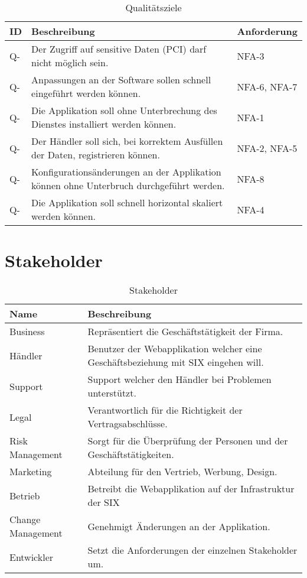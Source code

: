 \begin{table}[H]
	\centering
	\caption{Qualitätsziele}
	\begin{tabular}{ | p{1cm} | p{11cm} | p{3cm} | }
		\toprule
		{\textbf{ID}} & {\textbf{Beschreibung}} & {\textbf{Anforderung}}\\
		\midrule
		Q-\arabic{quatar} \stepcounter{quatar} & Der Zugriff auf sensitive Daten (PCI) darf nicht möglich sein. & NFA-3\\ \hline
		Q-\arabic{quatar} \stepcounter{quatar} & Anpassungen an der Software sollen schnell eingeführt werden können. & NFA-6, NFA-7\\ \hline
		Q-\arabic{quatar} \stepcounter{quatar} & Die Applikation soll ohne Unterbrechung des Dienstes installiert werden können. & NFA-1\\ \hline
		Q-\arabic{quatar} \stepcounter{quatar} & Der Händler soll sich, bei korrektem Ausfüllen der Daten, registrieren können. & NFA-2, NFA-5 \\ \hline
		Q-\arabic{quatar} \stepcounter{quatar} & Konfigurationsänderungen an der Applikation können ohne Unterbruch durchgeführt werden. & NFA-8 \\ \hline
		Q-\arabic{quatar} \stepcounter{quatar} & Die Applikation soll schnell horizontal skaliert werden können. & NFA-4 \\
		\bottomrule
	\end{tabular}
\end{table}

\section{Stakeholder}

\begin{table}[H]
	\centering
	\caption{Stakeholder}
	\begin{tabular}{ | p{3cm} | p{12cm} | }
		\toprule
		{\textbf{Name}} & {\textbf{Beschreibung}} \\
		\midrule
		Business & Repräsentiert die Geschäftstätigkeit der Firma.\\ \hline
		Händler & Benutzer der Webapplikation welcher eine Geschäftsbeziehung mit SIX eingehen will. \\ \hline
		Support & Support welcher den Händler bei Problemen unterstützt. \\ \hline
		Legal &  Verantwortlich für die Richtigkeit der Vertragsabschlüsse. \\ \hline
		Risk Management & Sorgt für die Überprüfung der Personen und der Geschäftstätigkeiten. \\ \hline
		Marketing & Abteilung für den Vertrieb, Werbung, Design. \\ \hline
		Betrieb & Betreibt die Webapplikation auf der Infrastruktur der SIX \\ \hline
		Change Management & Genehmigt Änderungen an der Applikation. \\ \hline
		Entwickler & Setzt die Anforderungen der einzelnen Stakeholder um. \\
		\bottomrule
	\end{tabular}
\end{table}
